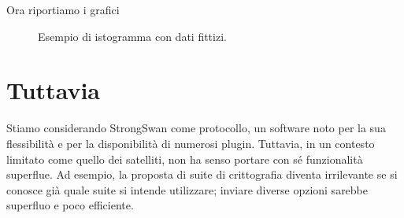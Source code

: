 Ora riportiamo i grafici


\begin{figure} 
    \centering 
    \caption{Esempio di istogramma con dati fittizi.} 
\end{figure}


\newpage
\section{Tuttavia}

Stiamo considerando StrongSwan come protocollo, un software noto per la sua
flessibilità e per la disponibilità di numerosi plugin. Tuttavia, in un contesto
limitato come quello dei satelliti, non ha senso portare con sé funzionalità
superflue. Ad esempio, la proposta di suite di crittografia diventa irrilevante
se si conosce già quale suite si intende utilizzare; inviare diverse opzioni
sarebbe superfluo e poco efficiente.

